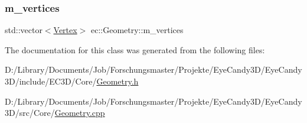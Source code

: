 \mbox{\label{classec_1_1_geometry_a501c19ed82548d9a8ff628f55e750af3}} 
\subsubsection{\texorpdfstring{m\+\_\+vertices}{m\_vertices}}
{\footnotesize\ttfamily std\+::vector$<$\mbox{\hyperlink{structec_1_1_vertex}{Vertex}}$>$ ec\+::\+Geometry\+::m\+\_\+vertices\hspace{0.3cm}{\ttfamily [protected]}}



The documentation for this class was generated from the following files\+:\begin{DoxyCompactItemize}
\item 
D\+:/\+Library/\+Documents/\+Job/\+Forschungsmaster/\+Projekte/\+Eye\+Candy3\+D/\+Eye\+Candy3\+D/include/\+E\+C3\+D/\+Core/\mbox{\hyperlink{_geometry_8h}{Geometry.\+h}}\item 
D\+:/\+Library/\+Documents/\+Job/\+Forschungsmaster/\+Projekte/\+Eye\+Candy3\+D/\+Eye\+Candy3\+D/src/\+Core/\mbox{\hyperlink{_geometry_8cpp}{Geometry.\+cpp}}\end{DoxyCompactItemize}
